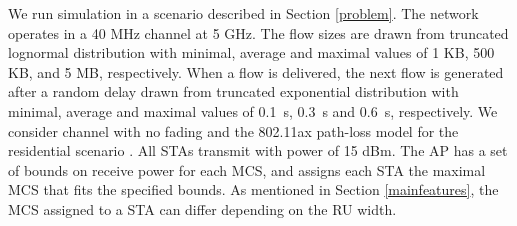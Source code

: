 We run simulation in a scenario described in Section \ref{problem}.
The network operates in a 40 MHz channel at 5 GHz.
The flow sizes are drawn from truncated lognormal distribution with minimal, average and maximal values of 1 KB, 500 KB, and 5 MB, respectively. When a flow is delivered, the next flow is generated after a random delay drawn from truncated exponential distribution with minimal, average and maximal values of \SI{0.1}{\s}, \SI{0.3}{\s} and \SI{0.6}{\s}, respectively.
We consider channel with no fading and the 802.11ax path-loss model for the residential scenario \cite{presentation_scenarios}.
All STAs transmit with power of 15 dBm.
The AP has a set of bounds on receive power for each MCS, and assigns each STA the maximal MCS that fits the specified bounds.
As mentioned in Section \ref{mainfeatures}, the MCS assigned to a STA can differ depending on the RU width.



